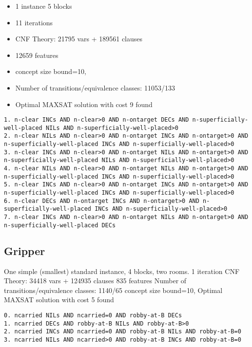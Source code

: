 \documentclass[a4paper]{article}
\begin{document}
\begin{itemize}
 \item 1 instance 5 blocks
 \item 11 iterations
 \item CNF Theory: 21795 vars + 189561 clauses
 \item 12659 features
 \item concept size bound=10,
 \item Number of transitions/equivalence classes: 11053/133
 \item Optimal MAXSAT solution with cost 9 found
\end{itemize}


\begin{Verbatim}[fontsize=\footnotesize]
1. n-clear INCs AND n-clear>0 AND n-ontarget DECs AND n-superficially-well-placed NILs AND n-superficially-well-placed>0
2. n-clear NILs AND n-clear>0 AND n-ontarget INCs AND n-ontarget>0 AND n-superficially-well-placed INCs AND n-superficially-well-placed>0
3. n-clear INCs AND n-clear>0 AND n-ontarget NILs AND n-ontarget>0 AND n-superficially-well-placed NILs AND n-superficially-well-placed>0
4. n-clear NILs AND n-clear>0 AND n-ontarget NILs AND n-ontarget>0 AND n-superficially-well-placed INCs AND n-superficially-well-placed>0
5. n-clear INCs AND n-clear>0 AND n-ontarget INCs AND n-ontarget>0 AND n-superficially-well-placed INCs AND n-superficially-well-placed>0
6. n-clear DECs AND n-ontarget INCs AND n-ontarget>0 AND n-superficially-well-placed INCs AND n-superficially-well-placed>0
7. n-clear INCs AND n-clear>0 AND n-ontarget NILs AND n-ontarget>0 AND n-superficially-well-placed DECs
\end{Verbatim}


\subsection{Gripper}
One simple (smallest) standard instance, 4 blocks, two rooms.
1 iteration
CNF Theory: 34418 vars + 124935 clauses
835 features
Number of transitions/equivalence classes: 1140/65
concept size bound=10,
Optimal MAXSAT solution with cost 5 found

\begin{Verbatim}[fontsize=\footnotesize]
0. ncarried NILs AND ncarried=0 AND robby-at-B DECs
1. ncarried DECs AND robby-at-B NILs AND robby-at-B>0
2. ncarried INCs AND ncarried=0 AND robby-at-B NILs AND robby-at-B=0
3. ncarried NILs AND ncarried>0 AND robby-at-B INCs AND robby-at-B=0
\end{Verbatim}
\end{document}
